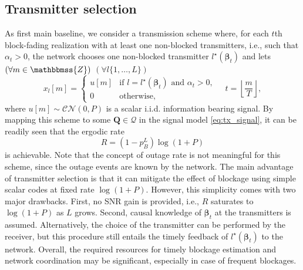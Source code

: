 \documentclass[10pt,journal,a4paper]{IEEEtran}
\newcommand{\stdset}[1]{\mathbbmss{#1}}	%
\newcommand{\set}[1]{\mathcal{#1}}		%
\renewcommand{\vec}[1]{\bm{#1}}		%
\newcommand{\CN}{\mathcal{CN}}			%
\begin{document}
\subsection{Transmitter selection}
As first main baseline, we consider a transmission scheme where, for each $t$th block-fading realization with at least one non-blocked transmitters, i.e., such that $\alpha_t > 0$, the network chooses one non-blocked transmitter $l^\star(\vec{\beta}_t)$ and lets $(\forall m \in \stdset{Z})$ $(\forall l \{1,\ldots,L\})$
\begin{equation*}
x_l[m] = \begin{cases} u[m] & \text{if } l = l^\star(\vec{\beta}_t) \text{ and } \alpha_t>0, \\ 0 & \text{otherwise,}\end{cases} \quad t=\left\lfloor \frac{m}{T}\right\rfloor,
\end{equation*}
where $u[m]\sim \CN(0,P)$ is a scalar i.i.d. information bearing signal. 
By mapping this scheme to some $\vec{Q}\in \set{Q}$ in the signal model \eqref{eq:tx_signal}, it can be readily seen that the ergodic rate 
\begin{equation*}
R = (1-p_B^L)\log(1+P)
\end{equation*} 
is achievable. Note that the concept of outage rate is not meaningful for this scheme, since the outage events are known by the network. The main advantage of transmitter selection is that it can mitigate the effect of blockage using simple scalar codes at fixed rate $\log(1+P)$. However, this simplicity comes with two major drawbacks. First, no SNR gain is provided, i.e., $R$ saturates to $\log(1+P)$ as $L$ grows. Second, causal knowledge of $\vec{\beta}_t$ at the transmitters is assumed. Alternatively, the choice of the transmitter can be performed by the receiver, but this procedure still entails the timely feedback of $l^\star(\vec{\beta}_t)$ to the network. Overall, the required resources for timely blockage estimation and network coordination may be significant, especially in case of frequent blockages.  
\end{document}
